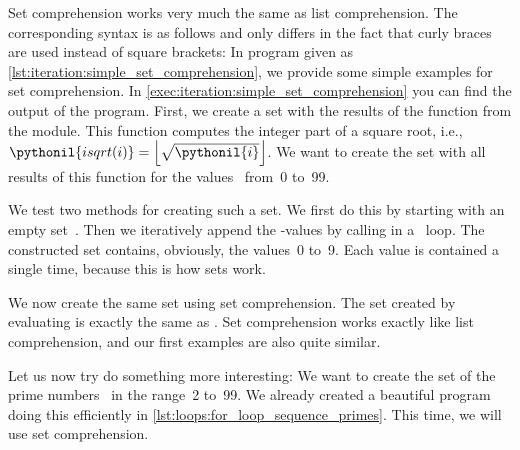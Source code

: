 Set comprehension works very much the same as list comprehension.
The corresponding syntax is as follows and only differs in the fact that curly braces are used instead of square brackets:%
%
%
\FloatBarrier%
%
%
%
%
In program  given as \cref{lst:iteration:simple_set_comprehension}, we provide some simple examples for set comprehension.
In \cref{exec:iteration:simple_set_comprehension} you can find the output of the program.
First, we create a set with the results of the  function from the  module.
This function computes the integer part of a square root, i.e., $\pythonil{isqrt(i)}=\left\lfloor\sqrt{\pythonil{i}}\right\rfloor$.
We want to create the set with all results of this function for the values~ from~0 to~99.

We test two methods for creating such a set.
We first do this by starting with an empty set~.
Then we iteratively append the -values by calling  in a ~loop.
The constructed set contains, obviously, the values~0 to~9.
Each value is contained a single time, because this is how sets work.%
%
\begin{sloppypar}%
We now create the same set using set comprehension.
The set  created by evaluating  is exactly the same as .
Set comprehension works exactly like list comprehension, and our first examples are also quite similar.%
\end{sloppypar}%
%
Let us now try do something more interesting:
We want to create the set  of the prime numbers~\cite{W2024MAWWR:PN,CP2005PNACP,R1994PNACMFF} in the range~2 to~99.
We already created a beautiful program doing this efficiently in \cref{lst:loops:for_loop_sequence_primes}.
This time, we will use set comprehension.

